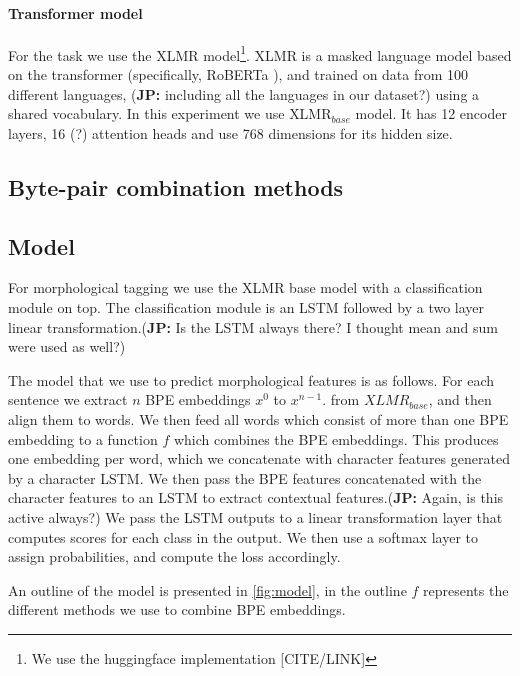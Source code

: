 \documentclass[11pt]{article}
\newcommand\jp[1]{(\textbf{JP:} #1)}
\begin{document}
	\paragraph{Transformer model}
	For the task we use the XLMR \citep{conneau2019unsupervised}
        model\footnote{We use the huggingface implementation
          [CITE/LINK]}. XLMR is a masked language model based on the
        transformer (specifically, RoBERTa \citep{liu2019roberta}),
        and trained on data from 100 different languages,
        \jp{including all the languages in our dataset?} using a
        shared vocabulary. In this experiment we use
        \textsc{XLMR}$_{base}$ model. It has 12 encoder layers, 16 (?)
        attention heads and use 768 dimensions for its hidden size.
	
	\subsection{Byte-pair combination methods}
	


	
	\subsection{Model}
	For morphological tagging we use the XLMR base model with a
        classification module on top. The classification module is an
        LSTM followed by a two layer linear transformation.\jp{Is the
          LSTM always there? I thought mean and sum were used as
          well?}
	
	The model that we use to predict morphological features is as
        follows. For each sentence we extract $n$ BPE embeddings $x^0$
        to $x^{n-1}$. from $XLMR_{base}$, and then align them to
        words.  We then feed all words which consist of more than one
        BPE embedding to a function $f$ which combines the BPE
        embeddings. This produces one embedding per word, which we
        concatenate with character features generated by a character
        LSTM. We then pass the BPE features concatenated with the
        character features to an LSTM to extract contextual
        features.\jp{Again, is this active always?}  We pass the LSTM
        outputs to a linear transformation layer that computes scores
        for each class in the output. We then use a softmax layer to
        assign probabilities, and compute the loss accordingly.
	
	An outline of the model is presented in \cref{fig:model}, in
        the outline $f$ represents the different methods we use to
        combine BPE embeddings.
	
\end{document}
